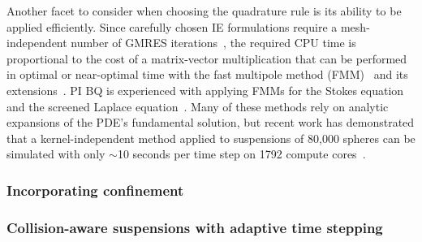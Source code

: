 Another facet to consider when choosing the quadrature rule is its
ability to be applied efficiently. Since carefully chosen IE
formulations require a mesh-independent number of GMRES
iterations~\cite{cam-ips-kel-mey-xue1996}, the required CPU time is
proportional to the cost of a matrix-vector multiplication that can be
performed in optimal or near-optimal time with the fast multipole method
(FMM)~\cite{fmm5} and its extensions~\cite{fmm1, fmm2, fmm3, fmm4, fmm6,
fmm7, ros-ols2016}. PI BQ is experienced with applying FMMs for the
Stokes equation~\cite{qua-bir2014, bys-sha-qua2020} and the screened
Laplace equation~\cite{kro-qua2011, qua2011}. Many of these methods rely
on analytic expansions of the PDE's fundamental solution, but recent
work has demonstrated that a kernel-independent method applied to
suspensions of 80,000 spheres can be simulated with only $\sim$10
seconds per time step on 1792 compute cores~\cite{Yan2019}.

%

\subsubsection{Incorporating confinement}
\label{subsec:Confinement}


\subsubsection{Collision-aware suspensions with adaptive time stepping}
\label{subsec:timeStepping}

